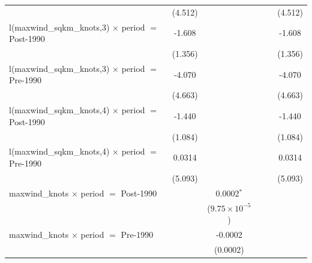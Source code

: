 \begin{tabular}{lccccc}
                                                              & (4.512)        &                         &                &                         & (4.512)\\   
   l(maxwind\_sqkm\_knots,3) $\times$ period $=$ Post-1990    & -1.608         &                         &                &                         & -1.608\\   
                                                              & (1.356)        &                         &                &                         & (1.356)\\   
   l(maxwind\_sqkm\_knots,3) $\times$ period $=$ Pre-1990     & -4.070         &                         &                &                         & -4.070\\   
                                                              & (4.663)        &                         &                &                         & (4.663)\\   
   l(maxwind\_sqkm\_knots,4) $\times$ period $=$ Post-1990    & -1.440         &                         &                &                         & -1.440\\   
                                                              & (1.084)        &                         &                &                         & (1.084)\\   
   l(maxwind\_sqkm\_knots,4) $\times$ period $=$ Pre-1990     & 0.0314         &                         &                &                         & 0.0314\\   
                                                              & (5.093)        &                         &                &                         & (5.093)\\   
   maxwind\_knots $\times$ period $=$ Post-1990               &                & 0.0002$^{*}$            &                &                         &   \\   
                                                              &                & ($9.75\times 10^{-5}$)  &                &                         &   \\   
   maxwind\_knots $\times$ period $=$ Pre-1990                &                & -0.0002                 &                &                         &   \\   
                                                              &                & (0.0002)                &                &                         &   \\   

\end{tabular}
